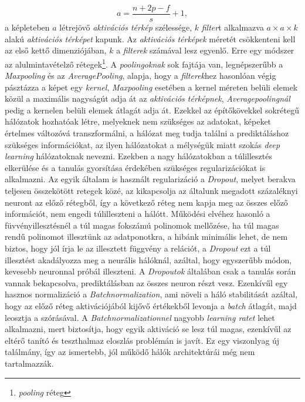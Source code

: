 \documentclass[12pt,letterpaper,oneside,openright]{book}
\begin{document}
\begin{equation}
a = \frac{n+2p-f}{s} +1,
\end{equation}
a képleteben $a$ létrejövő \textit{aktivációs térkép} szélessége, $k$ \textit{filter}t alkalmazva $a\times a\times k$ alakú \textit{aktivációs térképet} kapunk. Az \textit{aktivációs térképek} méretét csökkenteni kell az első kettő dimenziójában, $k$ a \textit{filterek} számával lesz egyenlő. Erre egy módszer az alulmintavételző rétegek\footnote{\textit{pooling} réteg}. A \textit{poolingoknak} sok fajtája van, legnépszerűbb a \textit{Maxpooling} és az \textit{AveragePooling}, alapja, hogy a \textit{filterek}hez hasonlóan végig pásztázza a képet egy \textit{kernel},  \textit{Maxpooling} esetében a kernel méreten belüli elemek közül a maximális nagyságút adja át az \textit{aktivációs térképnek}, \textit{Averagepoolingnál} pedig a kernelen belüli elemek átlagát adja át. 
\newline\indent
Ezekkel az építőkövekkel sokrétegű hálózatok hozhatóak létre, melyeknek nem szükséges az adatokat, képeket értelmes változóvá transzformálni, a hálózat meg tudja találni a prediktáláshoz szükséges információkat, az ilyen hálózatokat a mélységük miatt szokás \textit{deep learning} hálózatoknak nevezni. Ezekben a nagy hálózatokban a túlillesztés elkerülése és a tanulás gyorsítása érdekében szükséges regularizációkat is alkalmazni. Az egyik általam is használt regularizáció a \textit{Dropout}, melyet berakva teljesen összekötött retegek közé, az kikapcsolja az általunk megadott százaléknyi neuront az előző rétegből, így a következő réteg nem kapja meg az összes előző információt, nem engedi túlilleszteni a hálótt. Működési elvéhez hasonló a füvvényillesztésnél a túl magas fokszámú polinomok mellőzése, ha túl magas rendű polinomot illesztünk az adatponotkra, a hibánk minimális lehet, de nem biztos, hogy jól írja le az illesztett függvény a relációt, a \textit{Dropout} ezt a túl illesztést akadályozza meg a neurális hálóknál, azáltal, hogy egyszerűbb módon, kevesebb neuronnal próbál illeszteni. A \textit{Dropoutok} általában csak a tanulás során vannak bekapcsolva, prediktálásban az összes neuron részt vesz. Ezenkívűl egy hasznos normalizáció a \textit{Batchnormalization}, ami növeli a háló stabilitását azáltal, hogy az előző réteg aktivációjából kijővő értékekből levonja a \textit{batch} átlagát, majd leosztja a szórásával. A \textit{Batchnormalizationnel} nagyobb \textit{learning ratet} lehet alkalmazni, mert biztosítja, hogy egyik aktiváció se lesz túl magas, ezenkívűl az eltérő tanító és teszthalmaz eloszlás problémán is javít. Ez egy viszonlyag új találmány, így az ismertebb, jól működő hálók architektúrái még nem tartalmazzák.
\end{document}
